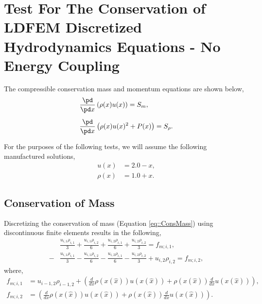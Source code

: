 \documentclass{article}
\newcommand{\x}{x(\hat{x})}
\begin{document}
\section{Test For The Conservation of LDFEM Discretized Hydrodynamics Equations - No Energy Coupling}
The compressible conservation mass and momentum equations are shown below,
\begin{align}
\label{eq::ConsMass}
&\frac{\pd}{\pd x}\left( \rho(x) u(x) \right) = S_m,\\[5pt]
\label{eq::ConsMomen}
&\frac{\pd}{\pd x}\left( \rho(x) u(x)^2 + P(x) \right) = S_\rho.
\end{align}

For the purposes of the following tests, we will assume the following manufactured solutions,
\begin{align}
\label{eq::MMS-Velocity}
u(x) &= 2.0 - x,\\[5pt]
\label{eq::MMS-Density}
\rho(x) &= 1.0 + x.
\end{align}

\subsection{Conservation of Mass}
Discretizing the conservation of mass (Equation \ref{eq::ConsMass}) using discontinuous finite elements results in the following,
\begin{align}
\label{eq::LDFEM-MassLHS-1}
&\frac{u_{i,1}\rho_{i,1}}{3} + \frac{u_{i,1}\rho_{i,2}}{6} + \frac{u_{i,2}\rho_{i,1}}{6} + \frac{u_{i,2}\rho_{i,2}}{3} = f_{m;i,1},\\[5pt]
\label{eq::LDFEM-MassLHS-2}
-&\frac{u_{i,1}\rho_{i,1}}{3} - \frac{u_{i,1}\rho_{i,2}}{6} - \frac{u_{i,2}\rho_{i,1}}{6} - \frac{u_{i,2}\rho_{i,2}}{3} + u_{i,2}\rho_{i,2} = f_{m;i,2},
\end{align}
where,
\begin{align}
\label{eq::LDFEM-MassRHS-1}
f_{m;i,1} &= u_{i-1,2}\rho_{i-1,2} + \left( \frac{d}{dx}\rho(\x) u(\x) + \rho(\x)\frac{d}{dx}u(\x) \right),\\[5pt]
\label{eq::LDFEM-MassRHS-2}
f_{m;i,2} &= \left( \frac{d}{dx}\rho(\x)u(\x) + \rho(\x)\frac{d}{dx}u(\x) \right).
\end{align}
\end{document}
